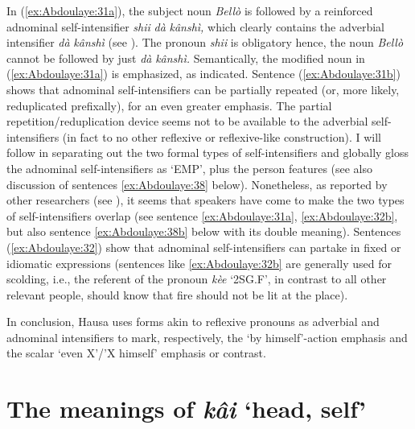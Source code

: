 \documentclass[output=paper]{langscibook}
\begin{document}
In (\ref{ex:Abdoulaye:31a}), the subject noun \textit{Bellò} is followed by a reinforced adnominal self-intensifier \textit{shii} \textit{dà} \textit{kânshì,} which clearly contains the adverbial intensifier \textit{dà} \textit{kânshì} (see ). The pronoun \textit{shii} is obligatory hence, the noun \textit{Bellò} cannot be followed by just \textit{dà} \textit{kânshì.} Semantically, the modified noun in (\ref{ex:Abdoulaye:31a}) is emphasized, as indicated. Sentence (\ref{ex:Abdoulaye:31b}) shows that adnominal self-intensifiers can be partially repeated (or, more likely, reduplicated prefixally), for an even greater emphasis. The partial repetition/reduplication device seems not to be available to the adverbial self-intensifiers (in fact to no other reflexive or reflexive-like construction). I will follow \citet[527]{Newman2000} in separating out the two formal types of self-intensifiers and globally gloss the adnominal self-intensifiers as ‘EMP’, plus the person features (see also discussion of sentences \ref{ex:Abdoulaye:38} below). Nonetheless, as reported by other researchers (see \citealt[117]{Wolff1993}), it seems that speakers have come to make the two types of self-intensifiers overlap (see sentence \ref{ex:Abdoulaye:31a}, \ref{ex:Abdoulaye:32b}, but also sentence \ref{ex:Abdoulaye:38b} below with its double meaning). Sentences (\ref{ex:Abdoulaye:32}) show that adnominal self-intensifiers can partake in fixed or idiomatic expressions (sentences like \ref{ex:Abdoulaye:32b} are generally used for scolding, i.e., the referent of the pronoun \textit{kèe} ‘2SG.F’, in contrast to all other relevant people, should know that fire should not be lit at the place).


In conclusion, Hausa uses forms akin to reflexive pronouns as adverbial and adnominal intensifiers to mark, respectively, the ‘by himself’-action emphasis and the scalar ‘even X’/’X himself’ emphasis or contrast.

\section{The meanings of \textit{kâi} ‘head, self’}\label{sec:Abdoulaye:7}
\end{document}

